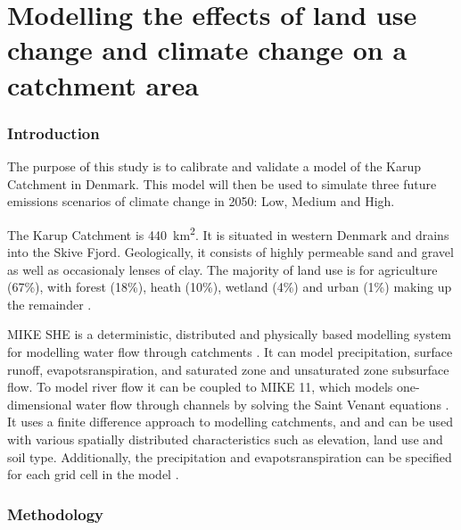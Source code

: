 \documentclass{article}
\begin{document}
\printbibliography[filter=practical1]

\newpage
\setcounter{section}{0}
\setcounter{figure}{0}

\part*{Modelling the effects of land use change and climate change on a catchment area}

\section{Introduction}

The purpose of this study is to calibrate and validate a model of the Karup Catchment in Denmark. This model will then be used to simulate three future emissions scenarios of climate change in 2050: Low, Medium and High.  

The Karup Catchment is \SI{440}{km^2}. It is situated in western Denmark and drains into the Skive Fjord. Geologically, it consists of highly permeable sand and gravel as well as occasionaly lenses of clay. 
The majority of land use is for agriculture (67\%), with forest (18\%), heath (10\%), wetland (4\%) and urban (1\%) making up the remainder \parencite{refsgaard1997parameterisation}.


MIKE SHE is a deterministic, distributed and physically based modelling system for modelling water flow through catchments \parencite{refsgaard1995mike, refsgaard2010systeme}. It can model precipitation, surface runoff, evapotsranspiration, and saturated zone and unsaturated zone subsurface flow. To model river flow it can be coupled to MIKE 11, which models one-dimensional water flow through channels by solving the Saint Venant equations \parencite{havno1995mike}.  
It uses a finite difference approach to modelling catchments, and  and can be used with various spatially distributed characteristics such as elevation, land use and soil type. Additionally, the precipitation and evapotsranspiration can be specified for each grid cell in the model \parencite{thompson2012modelling}.


\newpage
\section{Methodology}
\end{document}
